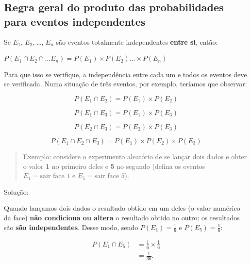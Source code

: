 \documentclass[
]{book}
\begin{document}
\hfill\break

\hypertarget{regra-geral-do-produto-das-probabilidades-para-eventos-independentes}{%
\subsection{Regra geral do produto das probabilidades para eventos independentes}\label{regra-geral-do-produto-das-probabilidades-para-eventos-independentes}}

Se \(E_{1}\), \(E_{2}\), \ldots, \(E_{n}\) são eventos totalmente independentes \textbf{entre si}, então:

\begin{center}
$P (E_{1} \cap E_{2} \cap ... E_{n})= P(E_{1}) \times P(E_{2}) ... \times P(E_{n})$
\end{center}

Para que isso se verifique, a independência entre cada um e todos os eventos deve se verificada. Numa situação de três eventos, por exemplo, teríamos que observar:

\[
P (E_{1} \cap E_{2})= P(E_{1}) \times P(E_{2})
\]

\[
P (E_{1} \cap E_{3})= P(E_{1}) \times P(E_{3})\]

\[
P (E_{2} \cap E_{3})= P(E_{2}) \times P(E_{3})
\]

\[
P (E_{1} \cap E_{2} \cap E_{3} )= P(E_{1}) \times P(E_{2}) \times P(E_{3})
\]

\hfill\break

\begin{quote}
Exemplo: considere o experimento aleatório de se lançar dois dados e obter o valor \textbf{1} no primeiro deles e \textbf{5} no segundo (defina os eventos \textbf{\(E_{1}= \text{sair face 1}\)} e \textbf{\(E_{5}=\text{sair face 5}\)}).
\end{quote}

\hfill\break

Solução:

Quando lançamos dois dados o resultado obtido em um deles (o valor numérico da face) \textbf{não condiciona ou altera} o resultado obtido no outro: os resultados são \textbf{são independentes}. Desse modo, sendo \(P(E_{1})=\frac{1}{6}\) e \(P(E_{5})=\frac{1}{6}\):

\begin{align*}
P(E_{1} \cap E_{5}) & = \frac{1}{6} \times \frac{1}{6}\\
                    & = \frac{1}{36}.
\end{align*}
\end{document}
